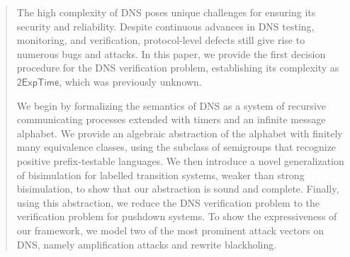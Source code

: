 \begin{abstract}
The high complexity of DNS poses unique challenges for ensuring  its security and reliability. Despite continuous advances in DNS testing, monitoring, and verification, protocol-level defects still give rise to numerous bugs and attacks. In this paper, we provide the first decision procedure for the DNS verification problem, establishing its complexity as $\mathsf{2ExpTime}$, which was previously unknown. 

We begin by formalizing the semantics of DNS as a system of recursive communicating processes extended with timers and an infinite message alphabet. We provide an algebraic abstraction of the alphabet with finitely many equivalence classes, using the subclass of semigroups that recognize positive prefix-testable languages. We then introduce a novel generalization of bisimulation for labelled transition systems, weaker than strong bisimulation, to show that our abstraction is sound and complete. Finally, using this abstraction, we reduce the DNS verification problem to the verification problem for pushdown systems. To show the expressiveness of our framework, we model two of the most prominent attack vectors on DNS, namely amplification attacks and rewrite blackholing.
\end{abstract}



